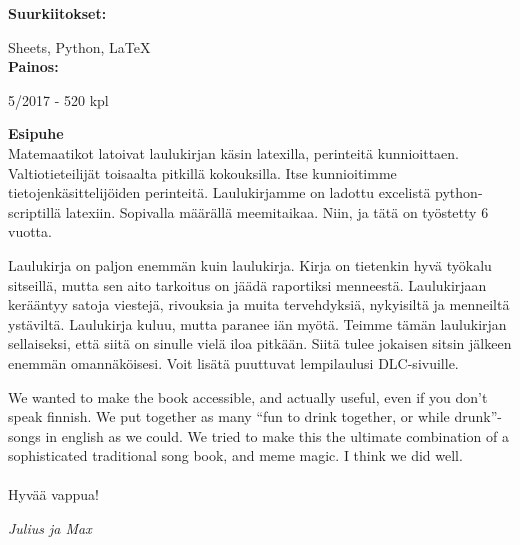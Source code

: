 \textbf{Suurkiitokset:}

Sheets, Python, \LaTeX
\\

\textbf{Painos:}

5/2017 - 520 kpl

\newpage

\textbf{Esipuhe}
\\

Matemaatikot latoivat laulukirjan käsin latexilla, perinteitä kunnioittaen.
Valtiotieteilijät toisaalta pitkillä kokouksilla. Itse kunnioitimme
tietojenkäsittelijöiden perinteitä. Laulukirjamme on ladottu excelistä
python-scriptillä latexiin. Sopivalla määrällä meemitaikaa. Niin, ja tätä on työstetty 6 vuotta.

Laulukirja on paljon enemmän kuin laulukirja. Kirja on tietenkin hyvä työkalu
sitseillä, mutta sen aito tarkoitus on jäädä raportiksi menneestä. Laulukirjaan
kerääntyy satoja viestejä, rivouksia ja muita tervehdyksiä, nykyisiltä ja
menneiltä ystäviltä. Laulukirja kuluu, mutta paranee iän myötä. Teimme tämän
laulukirjan sellaiseksi, että siitä on sinulle vielä iloa pitkään. Siitä tulee
jokaisen sitsin jälkeen enemmän omannäköisesi. Voit lisätä puuttuvat lempilaulusi DLC-sivuille.

We wanted to make the book accessible, and actually useful, even if you don’t
speak finnish. We put together as many “fun to drink together, or while drunk”-songs
in english as we could. We tried to make this the ultimate combination of a
sophisticated traditional song book, and meme magic. I think we did well.
\\
\\
Hyvää vappua!

\vfill
\textit{Julius ja Max}

\newpage
